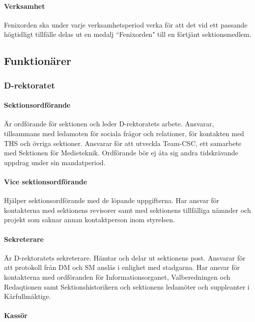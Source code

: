 \documentclass[a4paper,12pt]{article}
\begin{document}
\paragraph{Verksamhet}

Fenixorden ska under varje verksamhetsperiod verka för att det vid ett passande högtidligt tillfälle delas ut en medalj ``Fenixorden" till en förtjänt sektionsmedlem.

\subsection{Funktionärer}

\subsubsection{D-rektoratet}

\paragraph{Sektionsordförande}

Är ordförande för sektionen och leder D-rektoratets arbete. Ansvarar, tillsammans med ledamoten för sociala frågor och relationer, för kontakten med THS och övriga sektioner. Ansvarar för att utveckla Team-CSC, ett samarbete med Sektionen för Medieteknik. Ordförande bör ej åta sig andra tidskrävande uppdrag under sin mandatperiod.

\paragraph{Vice sektionsordförande}

Hjälper sektionsordförande med de löpande uppgifterna. Har ansvar för kontakterna med sektionens revisorer samt med sektionens tillfälliga nämnder och projekt som saknar annan kontaktperson inom styrelsen.

\paragraph{Sekreterare}

Är D-rektoratets sekreterare. Hämtar och delar ut sektionens post. Ansvarar för att protokoll från DM och SM anslås i enlighet med stadgarna. Har ansvar för kontakterna med ordföranden för Informationsorganet, Valberedningen och Redaqtionen samt Sektionshistorikern och sektionens ledamöter och suppleanter i Kårfullmäktige.

\paragraph{Kassör}
\end{document}
